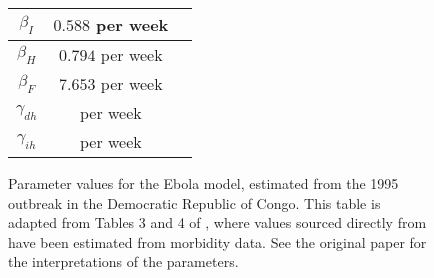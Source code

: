 \begin{figure}
\begin{center}
\begin{tabular}{|c|c|p{7cm}|}
			\(\beta_I\)     & \(0.588\) per week  & \citet{LegrandEtAl_2007_UnderstandingDynamicsEbola}                                                                                    \\ \hline
			\(\beta_H\)     & \(0.794\) per week  & \citet{LegrandEtAl_2007_UnderstandingDynamicsEbola}                                                                                    \\ \hline
			\(\beta_F\)     & \(7.653\) per week  & \citet{LegrandEtAl_2007_UnderstandingDynamicsEbola}                                                                                    \\ \hline
			\(\gamma_{dh}\) & per week            & \citet{LegrandEtAl_2007_UnderstandingDynamicsEbola}                                                                                    \\ \hline
			\(\gamma_{ih}\) & per week            & \citet{LegrandEtAl_2007_UnderstandingDynamicsEbola}                                                                                    \\ \hline
		\end{tabular}
	\end{center}
	\caption{Parameter values for the Ebola model, estimated from the 1995 outbreak in the Democratic Republic of Congo.
		This table is adapted from Tables 3 and 4 of \citet{LegrandEtAl_2007_UnderstandingDynamicsEbola}, where values sourced directly from \citet{LegrandEtAl_2007_UnderstandingDynamicsEbola} have been estimated from morbidity data.
		See the original paper for the interpretations of the parameters.}
	\label{tab:ebola_param_vals}
\end{figure}


